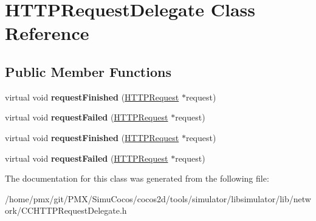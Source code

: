 \hypertarget{classHTTPRequestDelegate}{}\section{H\+T\+T\+P\+Request\+Delegate Class Reference}
\label{classHTTPRequestDelegate}
\subsection*{Public Member Functions}
\begin{DoxyCompactItemize}
\item 
\mbox{\label{classHTTPRequestDelegate_a38b7969e3dad0c31b114c5d5cc76ed88}} 
virtual void {\bfseries request\+Finished} (\hyperlink{classHTTPRequest}{H\+T\+T\+P\+Request} $\ast$request)
\item 
\mbox{\label{classHTTPRequestDelegate_a9eeed097b3a9f72451163bd8fe8c6167}} 
virtual void {\bfseries request\+Failed} (\hyperlink{classHTTPRequest}{H\+T\+T\+P\+Request} $\ast$request)
\item 
\mbox{\label{classHTTPRequestDelegate_a38b7969e3dad0c31b114c5d5cc76ed88}} 
virtual void {\bfseries request\+Finished} (\hyperlink{classHTTPRequest}{H\+T\+T\+P\+Request} $\ast$request)
\item 
\mbox{\label{classHTTPRequestDelegate_a9eeed097b3a9f72451163bd8fe8c6167}} 
virtual void {\bfseries request\+Failed} (\hyperlink{classHTTPRequest}{H\+T\+T\+P\+Request} $\ast$request)
\end{DoxyCompactItemize}


The documentation for this class was generated from the following file\+:\begin{DoxyCompactItemize}
\item 
/home/pmx/git/\+P\+M\+X/\+Simu\+Cocos/cocos2d/tools/simulator/libsimulator/lib/network/C\+C\+H\+T\+T\+P\+Request\+Delegate.\+h\end{DoxyCompactItemize}
